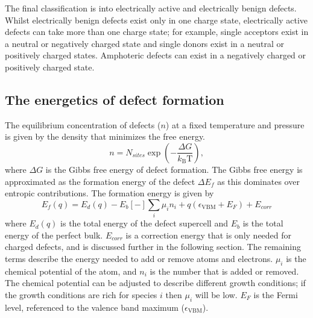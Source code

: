 The final classification is into electrically active and electrically benign defects. Whilst electrically benign defects exist only in one charge state, electrically active defects can take more than one charge state; for example, single acceptors exist in a neutral or negatively charged state and single donors exist in a neutral or positively charged states. Amphoteric defects can exist in a negatively charged or positively charged state.

\subsection{The energetics of defect formation} \label{defectformation}

The equilibrium concentration of defects ($n$) at a fixed temperature and pressure is given by the density that minimizes the free energy.
\begin{equation} \label{defectconcentration}
    n = N_{sites} \exp \left(-\frac{\Delta G}{k_\mathrm{B} \mathrm{T}} \right),
\end{equation}
where $\Delta G$ is the Gibbs free energy of defect formation. The Gibbs free energy is approximated as the formation energy of the defect $\Delta E_f$ as this dominates over entropic contributions. The formation energy is given by
\begin{equation} \label{eqn_formation_energy}
E_f(q) = E_d(q) - E_b [-] \sum_i \mu_i n_i + q(\epsilon_\mathrm{VBM}+E_F) + E_{corr}
\end{equation}
where $E_d(q)$ is the total energy of the defect supercell and $E_b$ is the total energy of the perfect bulk. 
$E_{corr}$ is a correction energy that is only needed for charged defects, and is discussed further in the following section.
The remaining terms describe the energy needed to add or remove atoms and electrons.
$\mu_i$ is the chemical potential of the atom, and $n_i$ is the number that is added or removed.
The chemical potential can be adjusted to describe different growth conditions; if the growth conditions are rich for species $i$ then $\mu_i$ will be low.
$E_F$ is the Fermi level, referenced to the valence band maximum ($\epsilon_\mathrm{VBM}$).

